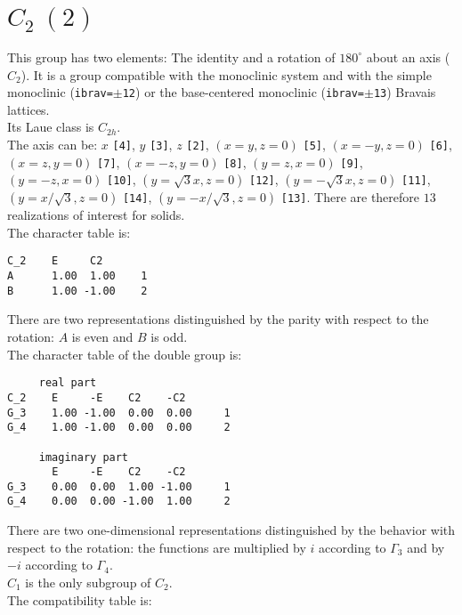 \documentclass[12pt,a4paper,twoside]{report}
\begin{document}
\newpage
{\color{coral}\section{$C_2\ (2)$}}
\color{black}
This group has two elements: The identity and a rotation of $180^\circ$ 
about an axis ($C_2$).
It is a group compatible with the monoclinic system and with the
simple monoclinic (\texttt{ibrav=$\pm$12}) or the base-centered monoclinic 
(\texttt{ibrav=$\pm$13}) Bravais lattices. \\
Its Laue class is $C_{2h}$. \\
The axis can be:  
$x$ \texttt{[4]}, $y$ \texttt{[3]}, $z$ \texttt{[2]}, 
$(x=y, z=0)$ \texttt{[5]}, $(x=-y, z=0)$ \texttt{[6]}, 
$(x=z, y=0)$ \texttt{[7]}, 
$(x=-z, y=0)$ \texttt{[8]},
$(y=z, x=0)$ \texttt{[9]}, $(y=-z, x=0)$ \texttt{[10]}, 
$(y=\sqrt{3}x, z=0)$ \texttt{[12]}, $(y=-\sqrt{3}x, z=0)$ \texttt{[11]}, 
$(y=x/\sqrt{3}, z=0)$ \texttt{[14]}, $(y=-x/\sqrt{3}, z=0)$ \texttt{[13]}. 
There are therefore $13$ realizations of interest for solids. \\
The character table is:

\begin{tcolorbox}
\begin{footnotesize}
\begin{verbatim}
C_2    E     C2
A      1.00  1.00    1
B      1.00 -1.00    2
\end{verbatim}
\end{footnotesize}
\end{tcolorbox}

There are two representations distinguished by the parity
with respect to the rotation: $A$ is even and $B$ is odd.\\
The character table of the double group is:

\begin{tcolorbox}
\begin{footnotesize}
\begin{verbatim}
     real part
C_2    E     -E    C2    -C2
G_3    1.00 -1.00  0.00  0.00     1
G_4    1.00 -1.00  0.00  0.00     2

     imaginary part
       E     -E    C2    -C2
G_3    0.00  0.00  1.00 -1.00     1
G_4    0.00  0.00 -1.00  1.00     2
\end{verbatim}
\end{footnotesize}
\end{tcolorbox}


There are two one-dimensional representations distinguished by the 
behavior with respect to the rotation: the functions
are multiplied by $i$ according to $\Gamma_3$ and by $-i$ according to 
$\Gamma_4$.\\
$C_1$ is the only subgroup of $C_2$. \\
The compatibility table is:
\end{document}

